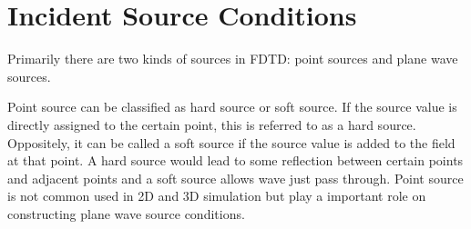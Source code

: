 \section{Incident Source Conditions}
Primarily there are two kinds of sources in FDTD: point sources and plane wave sources.

Point source can be classified as hard source or soft source. If the source value is directly assigned to the certain
point, this is referred to as a hard source. Oppositely, it can be called a soft source if the source value is added to
the field at that point. A hard source would lead to some reflection between certain points and adjacent points and a
soft source allows wave just pass through. Point source is not common used in 2D and 3D simulation but play a important
role on constructing plane wave source conditions.

